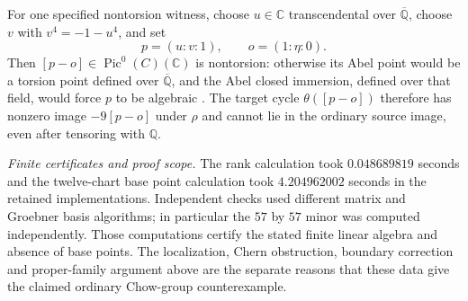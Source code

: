 For one specified nontorsion witness, choose
$u\in\mathbb C$ transcendental over
$\overline{\mathbb Q}$, choose $v$ with
$v^4=-1-u^4$, and set
\[
                       p=(u:v:1),\qquad o=(1:\eta:0).
\]
Then $[p-o]\in\operatorname{Pic}^0(C)(\mathbb C)$ is
nontorsion: otherwise its Abel point would be a
torsion point defined over $\overline{\mathbb Q}$,
and the Abel closed immersion, defined over that
field, would force $p$ to be algebraic
\citep[Proposition 2.3]{D_MilneJacobians2021}. The target
cycle $\theta([p-o])$ therefore has nonzero image
$-9[p-o]$ under $\rho$ and cannot lie in the ordinary
source image, even after tensoring with $\mathbb Q$.

\emph{Finite certificates and proof scope.}
The rank calculation took $0.048689819$ seconds and
the twelve-chart base point calculation took
$4.204962002$ seconds in the retained implementations.
Independent checks used different matrix and Groebner
basis algorithms; in particular the $57$ by $57$
minor was computed independently. Those computations
certify the stated finite linear algebra and absence
of base points. The localization, Chern obstruction,
boundary correction and proper-family argument above
are the separate reasons that these data give the
claimed ordinary Chow-group counterexample.
